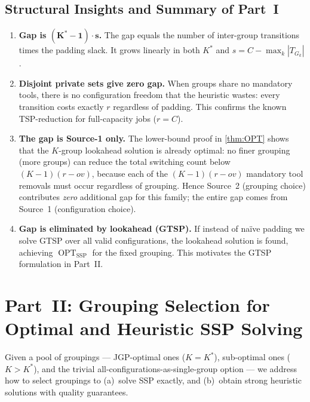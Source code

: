 \documentclass[11pt,a4paper]{article}
\theoremstyle{plain}
\theoremstyle{definition}
\DeclareMathOperator{\OPT}{OPT}
\newcommand{\Kstar}{K^{*}}          %
\begin{document}
\subsection{Structural Insights and Summary of Part~I}
\label{sec:partI-summary}

\begin{enumerate}[label=(\arabic*)]
  \item \textbf{Gap is $\boldsymbol{(K^*-1)\cdot s}$.}
        The gap equals the number of inter-group transitions times the padding slack.
        It grows linearly in both $K^*$ and $s = C - \max_k|T_{G_k}|$.

  \item \textbf{Disjoint private sets give zero gap.}
        When groups share no mandatory tools, there is no configuration freedom that
        the heuristic wastes: every transition costs exactly $r$ regardless of padding.
        This confirms the known TSP-reduction for full-capacity jobs ($r = C$).

  \item \textbf{The gap is Source-1 only.}
        The lower-bound proof in \cref{thm:OPT} shows that the $K$-group lookahead
        solution is already optimal: no finer grouping (more groups) can reduce the
        total switching count below $(K-1)(r-\mathit{ov})$, because each of the
        $(K-1)(r-\mathit{ov})$ mandatory tool removals must occur regardless of grouping.
        Hence Source~2 (grouping choice) contributes \emph{zero} additional gap
        for this family; the entire gap comes from Source~1 (configuration choice).

  \item \textbf{Gap is eliminated by lookahead (GTSP).}
        If instead of naïve padding we solve GTSP over all valid configurations,
        the lookahead solution is found, achieving $\OPT_{\text{SSP}}$ for the fixed grouping.
        This motivates the GTSP formulation in Part~II.
\end{enumerate}

\section{Part~II: Grouping Selection for Optimal and Heuristic SSP Solving}
\label{sec:partII}

Given a pool of groupings --- JGP-optimal ones ($K = \Kstar$), sub-optimal ones
($K > \Kstar$), and the trivial all-configurations-as-single-group option --- we
address how to select groupings to (a)~solve SSP exactly, and (b)~obtain strong
heuristic solutions with quality guarantees.
\end{document}
